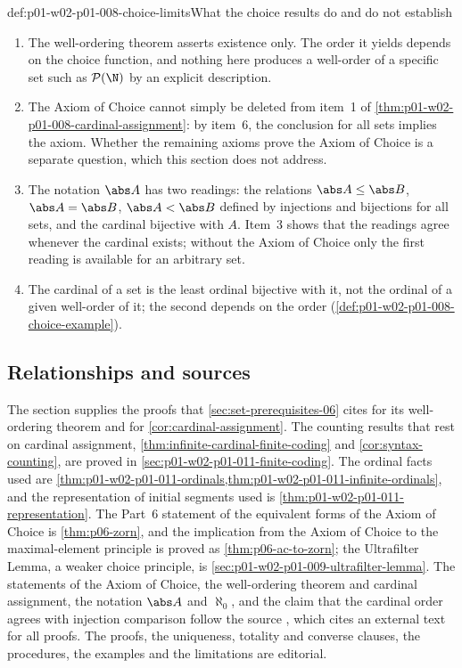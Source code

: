 \begin{hbwarning}{def:p01-w02-p01-008-choice-limits}{What the choice results do and do not establish}
\begin{enumerate}
  \item The well-ordering theorem asserts existence only. The order it
        yields depends on the choice function, and nothing here produces a
        well-order of a specific set such as \(\mathcal P(\N)\) by an
        explicit description.
  \item The Axiom of Choice cannot simply be deleted from item~1 of
        \cref{thm:p01-w02-p01-008-cardinal-assignment}: by item~6, the
        conclusion for all sets implies the axiom. Whether the remaining
        axioms prove the Axiom of Choice is a separate question, which this
        section does not address.
  \item The notation \(\abs A\) has two readings: the relations
        \(\abs A\leq\abs B\), \(\abs A=\abs B\), \(\abs A<\abs B\) defined by
        injections and bijections for all sets, and the cardinal bijective
        with \(A\). Item~3 shows that the readings agree whenever the
        cardinal exists; without the Axiom of Choice only the first reading
        is available for an arbitrary set.
  \item The cardinal of a set is the least ordinal bijective with it, not
        the ordinal of a given well-order of it; the second depends on the
        order (\cref{def:p01-w02-p01-008-choice-example}).
\end{enumerate}
\end{hbwarning}

\subsection{Relationships and sources}
\label{sec:p01-w02-p01-008-choice-sources}

The section supplies the proofs that \cref{sec:set-prerequisites-06} cites
for its well-ordering theorem and for \cref{cor:cardinal-assignment}. The
counting results that rest on cardinal assignment,
\cref{thm:infinite-cardinal-finite-coding} and \cref{cor:syntax-counting},
are proved in \cref{sec:p01-w02-p01-011-finite-coding}. The ordinal facts
used are \cref{thm:p01-w02-p01-011-ordinals,thm:p01-w02-p01-011-infinite-ordinals},
and the representation of initial segments used is
\cref{thm:p01-w02-p01-011-representation}. The Part~6 statement of the
equivalent forms of the Axiom of Choice is \cref{thm:p06-zorn}, and the
implication from the Axiom of Choice to the maximal-element principle is
proved as \cref{thm:p06-ac-to-zorn}; the Ultrafilter Lemma, a weaker choice
principle, is \cref{sec:p01-w02-p01-009-ultrafilter-lemma}. The statements
of the Axiom of Choice, the well-ordering theorem and cardinal assignment,
the notation \(\abs A\) and \(\aleph_0\), and the claim that the cardinal
order agrees with injection comparison follow the source
\cite[ch.~``Sets, Relations, Functions, and Cardinality'', sec.~``Choice
principles used later'']{FrozenFormalLogicOrdersChoice}, which cites an
external text for all proofs. The proofs, the uniqueness, totality and
converse clauses, the procedures, the examples and the limitations are
editorial.
